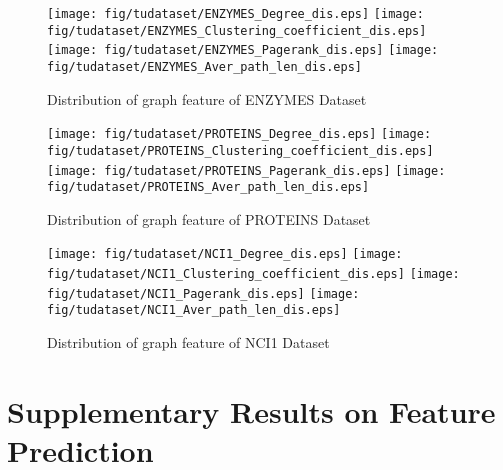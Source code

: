\documentclass[runningheads]{llncs}
\begin{document}
\begin{figure}
      \centering
      \begin{center}

       \hspace*{-1.5in}
          \texttt{[image: fig/tudataset/ENZYMES\_Degree\_dis.eps]}
          \texttt{[image: fig/tudataset/ENZYMES\_Clustering\_coefficient\_dis.eps]}
          \texttt{[image: fig/tudataset/ENZYMES\_Pagerank\_dis.eps]}
          \texttt{[image: fig/tudataset/ENZYMES\_Aver\_path\_len\_dis.eps]}
          \hspace*{-1.5in}
          \caption{Distribution of graph feature of ENZYMES Dataset}
      \end{center}

      \centering
  \begin{center}
 \hspace*{-1.5in}
    \texttt{[image: fig/tudataset/PROTEINS\_Degree\_dis.eps]}
    \texttt{[image: fig/tudataset/PROTEINS\_Clustering\_coefficient\_dis.eps]}
    \texttt{[image: fig/tudataset/PROTEINS\_Pagerank\_dis.eps]}
    \texttt{[image: fig/tudataset/PROTEINS\_Aver\_path\_len\_dis.eps]}
    \hspace*{-1.5in}
    \caption{Distribution of graph feature of PROTEINS Dataset}
  \end{center}


  \centering
  \begin{center}
 \hspace*{-1.5in}
    \texttt{[image: fig/tudataset/NCI1\_Degree\_dis.eps]}
    \texttt{[image: fig/tudataset/NCI1\_Clustering\_coefficient\_dis.eps]}
    \texttt{[image: fig/tudataset/NCI1\_Pagerank\_dis.eps]}
    \texttt{[image: fig/tudataset/NCI1\_Aver\_path\_len\_dis.eps]}
    \hspace*{-1.5in}
    \caption{Distribution of graph feature of NCI1 Dataset}
  \end{center}
      \end{figure}

\vspace{-0.5cm}
  \section{Supplementary Results on Feature Prediction }

\vspace{-0.5cm}
\end{document}
